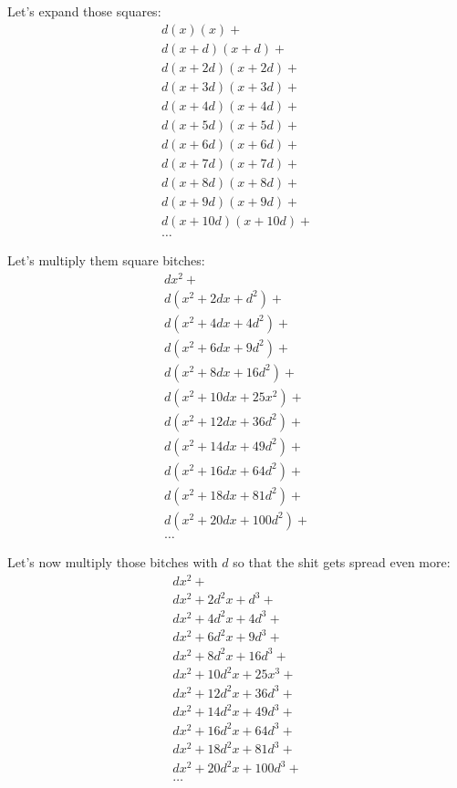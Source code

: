 \documentclass{report}
\begin{document}
Let's expand those squares:
\[\begin{split}
  d(x)(x) + \\
  d(x+d)(x+d) + \\
  d(x+2d)(x+2d) + \\
  d(x+3d)(x+3d) + \\
  d(x+4d)(x+4d) + \\
  d(x+5d)(x+5d) + \\
  d(x+6d)(x+6d) + \\
  d(x+7d)(x+7d) + \\
  d(x+8d)(x+8d) + \\
  d(x+9d)(x+9d) + \\
  d(x+10d)(x+10d) + \\
  \ldots
\end{split}\]

Let's multiply them square bitches:
\[\begin{split}
  dx^2 + \\
  d(x^2 + 2dx + d^2) + \\
  d(x^2 + 4dx + 4d^2) + \\
  d(x^2 + 6dx + 9d^2) + \\
  d(x^2 + 8dx + 16d^2) + \\
  d(x^2 + 10dx + 25x^2) + \\
  d(x^2+12dx   +36d^2) + \\
  d(x^2+14dx   +49d^2) + \\
  d(x^2+16dx   +64d^2) + \\
  d(x^2+18dx   +81d^2) + \\
  d(x^2+20dx   +100d^2) + \\
  \ldots
\end{split}\]


Let's now multiply those bitches with $d$ so that the shit gets spread even
more:
\[\begin{split}
  dx^2 + \\
  dx^2 + 2d^2x + d^3 + \\
  dx^2 + 4d^2x + 4d^3 + \\
  dx^2 + 6d^2x + 9d^3 + \\
  dx^2 + 8d^2x + 16d^3 + \\
  dx^2 + 10d^2x + 25x^3 + \\
  dx^2+12d^2x   +36d^3 + \\
  dx^2+14d^2x   +49d^3 + \\
  dx^2+16d^2x   +64d^3 + \\
  dx^2+18d^2x   +81d^3 + \\
  dx^2+20d^2x   +100d^3 + \\
  \ldots
\end{split}\]
\end{document}
